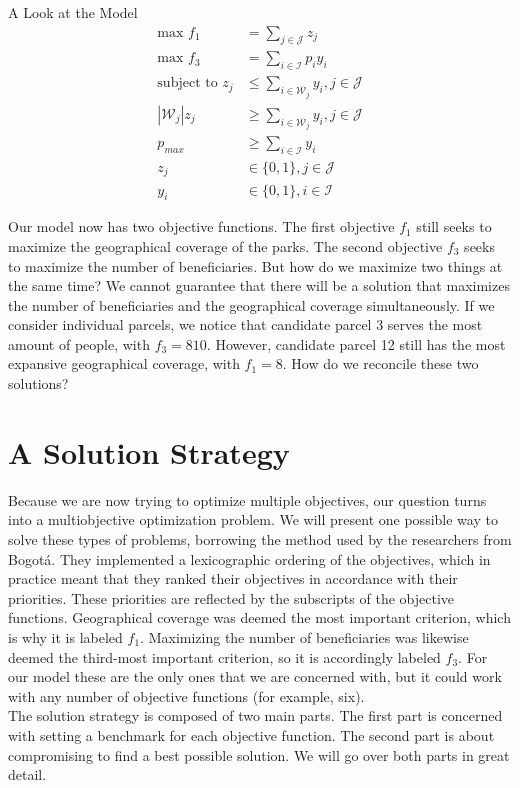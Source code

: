 \documentclass[12pt]{pom_thesis}
\theoremstyle{definition}
\begin{document}
\begin{chapter}{A Look at the Model}
\begin{align*}
\textrm{max } f_1 &= \sum_{j \in \mathcal{J}} z_j \\
\textrm{max } f_3 &= \sum_{i \in \mathcal{I}} p_iy_i \\
\textrm{subject to } z_j &\leq \sum_{i \in \mathcal{W}_j} y_i, j \in \mathcal{J}\\
\left|\mathcal{W}_j\right|z_j &\geq \sum_{i \in \mathcal{W}_j} y_i, j \in \mathcal{J} \\
p_{max} &\geq \sum_{i \in \mathcal{I}}y_i \\
z_j &\in \{0,1\}, j \in \mathcal{J} \\
y_i &\in \{0,1\}, i \in \mathcal{I}
\end{align*}

	Our model now has two objective functions. The first objective $f_1$ still seeks to maximize the geographical coverage of the parks. The second objective $f_3$ seeks to maximize the number of beneficiaries. But how do we maximize two things at the same time? We cannot guarantee that there will be a solution that maximizes the number of beneficiaries and the geographical coverage simultaneously. If we consider individual parcels, we notice that candidate parcel 3 serves the most amount of people, with $f_3 = 810$. However, candidate parcel 12 still has the most expansive geographical coverage, with $f_1 = 8$. How do we reconcile these two solutions?
%
%
%
%
\section{A Solution Strategy}

	Because we are now trying to optimize multiple objectives, our question turns into a multiobjective optimization problem. We will present one possible way to solve these types of problems, borrowing the method used by the researchers from Bogot\'{a}. They implemented a lexicographic ordering of the objectives, which in practice meant that they ranked their objectives in accordance with their priorities. These priorities are reflected by the subscripts of the objective functions. Geographical coverage was deemed the most important criterion, which is why it is labeled $f_1$. Maximizing the number of beneficiaries was likewise deemed the third-most important criterion, so it is accordingly labeled $f_3$. For our model these are the only ones that we are concerned with, but it could work with any number of objective functions (for example, six). \\
	The solution strategy is composed of two main parts. The first part is concerned with setting a benchmark for each objective function. The second part is about compromising to find a best possible solution. We will go over both parts in great detail.
%
%	

\end{chapter}
\end{document}
